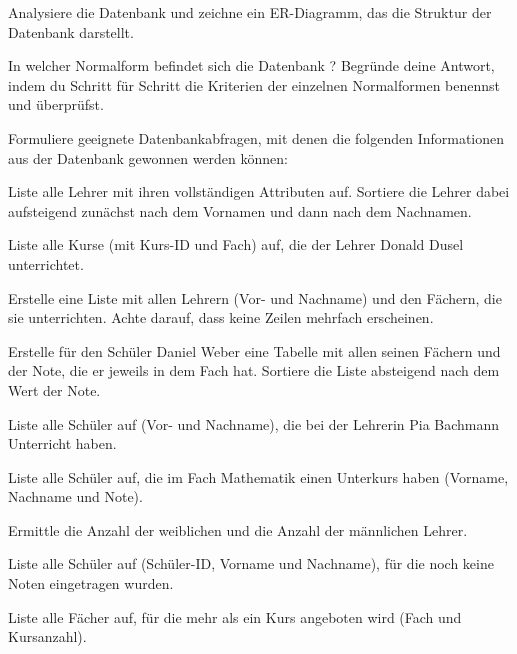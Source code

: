 \begin{compactenum}[a)]
\item Analysiere die Datenbank und zeichne ein ER-Diagramm, das die Struktur der
Datenbank darstellt.

\item In welcher Normalform befindet sich die Datenbank ?
Begründe deine Antwort, indem du Schritt für Schritt die Kriterien der
einzelnen Normalformen benennst und überprüfst.

\item Formuliere geeignete Datenbankabfragen, mit denen die folgenden
Informationen aus der Datenbank  gewonnen werden können:

\begin{compactenum}[1.]
\item Liste alle Lehrer mit ihren vollständigen Attributen auf. Sortiere die
Lehrer dabei aufsteigend zunächst nach dem Vornamen und dann nach dem Nachnamen.

\item Liste alle Kurse (mit Kurs-ID und Fach) auf, die der Lehrer Donald Dusel
unterrichtet.

\item Erstelle eine Liste mit allen Lehrern (Vor- und Nachname) und den Fächern,
die sie unterrichten. Achte darauf, dass keine Zeilen mehrfach erscheinen.

\item Erstelle für den Schüler Daniel Weber eine Tabelle mit allen seinen
Fächern und der Note, die er jeweils in dem Fach hat. Sortiere die Liste
absteigend nach dem Wert der Note.

\item Liste alle Schüler auf (Vor- und Nachname), die bei der Lehrerin Pia
Bachmann Unterricht haben.

\item Liste alle Schüler auf, die im Fach Mathematik einen Unterkurs haben
(Vorname, Nachname und Note).

\item Ermittle die Anzahl der weiblichen und die Anzahl der männlichen Lehrer.

\item Liste alle Schüler auf (Schüler-ID, Vorname und Nachname), für die noch
keine Noten eingetragen wurden.

\item Liste alle Fächer auf, für die mehr als ein Kurs angeboten wird (Fach und
Kursanzahl).


\end{compactenum}
\end{compactenum}
